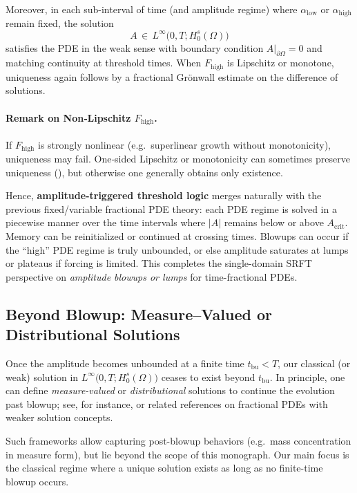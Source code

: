 \documentclass[12pt]{article}
\begin{document}
Moreover, in each sub-interval of time (and amplitude regime) 
where \(\alpha_{\mathrm{low}}\) or \(\alpha_{\mathrm{high}}\) remain fixed, 
the solution 
\[
A \,\in\, L^\infty\bigl(0,T;H_0^s(\Omega)\bigr)
\]
satisfies the PDE in the weak sense with boundary condition 
\(A|_{\partial\Omega}=0\) and matching continuity at threshold times. 
When \(F_{\mathrm{high}}\) is Lipschitz or monotone, uniqueness again follows 
by a fractional Grönwall estimate on the difference of solutions.

\paragraph{Remark on Non‐Lipschitz \(F_{\mathrm{high}}\).}
If \(F_{\mathrm{high}}\) is strongly nonlinear (e.g.\ superlinear growth without monotonicity),
uniqueness may fail. One‐sided Lipschitz or monotonicity can sometimes preserve uniqueness
(\cite[Ch.\,7]{Diethelm2010}), but otherwise one generally obtains only existence.  

Hence, \textbf{amplitude-triggered threshold logic} merges naturally with the previous
fixed/variable fractional PDE theory: each PDE regime is solved in a piecewise manner over
the time intervals where \(\lvert A\rvert\) remains below or above \(A_{\mathrm{crit}}\).
Memory can be reinitialized or continued at crossing times. Blowups can occur if the
“high” PDE regime is truly unbounded, or else amplitude saturates at lumps or plateaus
if forcing is limited. This completes the single-domain SRFT perspective on \emph{amplitude
blowups or lumps} for time-fractional PDEs.

\subsection{Beyond Blowup: Measure--Valued or Distributional Solutions}
\label{subsec:post_blowup_measure_valued}

Once the amplitude becomes unbounded at a finite time \(t_{\mathrm{bu}}<T\),
our classical (or weak) solution in \(L^\infty\bigl(0,T;H_0^s(\Omega)\bigr)\) 
ceases to exist beyond \(t_{\mathrm{bu}}\). In principle, one can define 
\emph{measure-valued} or \emph{distributional} solutions to continue 
the evolution past blowup; see, for instance, 
\cite[Section~4]{Zacher2005} or related references on fractional PDEs 
with weaker solution concepts. 

Such frameworks allow capturing post-blowup behaviors (e.g.\ mass concentration 
in measure form), but lie beyond the scope of this monograph. Our main focus 
is the classical regime where a unique solution exists as long as no finite-time 
blowup occurs.
\end{document}
